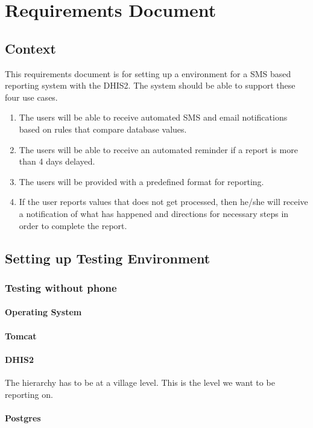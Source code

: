 \chapter{Requirements Document}

\section{Context}
This requirements document is for setting up a environment for a SMS based reporting system with the DHIS2. The system should be able to support these four use cases.

\begin{enumerate}
	\item The users will be able to receive automated SMS and email notifications based on rules that compare database values.
	\item The users will be able to receive an automated reminder if a report is more than 4 days delayed.
	\item The users will be provided with a predefined format for reporting.
	\item If the user reports values that does not get processed, then he/she will receive a notification of what has happened and directions for necessary steps in order to complete the report.
\end{enumerate} 

\section{Setting up Testing Environment}

\subsection{Testing without phone}
\subsubsection{Operating System}
\subsubsection{Tomcat}
\subsubsection{DHIS2}
The hierarchy has to be at a village level. This is the level we want to be reporting on.
\subsubsection{Postgres}
